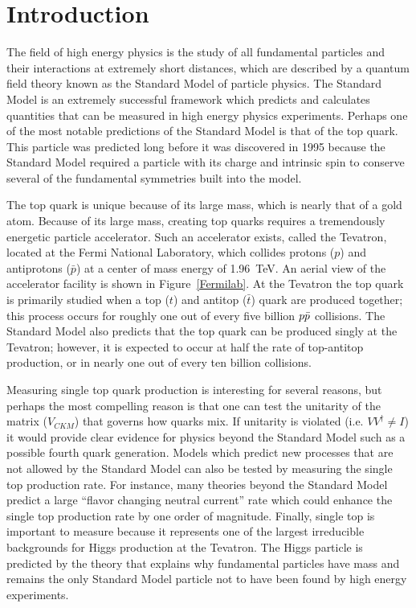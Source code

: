 \chapter{Introduction}

The field of high energy physics is the study of all fundamental particles and their interactions at extremely short distances, which are described by a quantum field theory known as the Standard Model of particle physics. The Standard Model is an extremely successful framework which predicts and calculates quantities that can be measured in high energy physics experiments. Perhaps one of the most notable predictions of the Standard Model is that of the top quark. This particle was predicted long before it was discovered in 1995 because the Standard Model required a particle with its charge and intrinsic spin to conserve several of the fundamental symmetries built into the model.

The top quark is unique because of its large mass, which is nearly that of a gold atom. Because of its large mass, creating top quarks requires a tremendously energetic particle accelerator. Such an accelerator exists, called the Tevatron, located at the Fermi National Laboratory, which collides protons ($p$) and antiprotons ($\bar{p}$) at a center of mass energy of 1.96~TeV. An aerial view of the accelerator facility is shown in Figure~\ref{Fermilab}. At the Tevatron the top quark is primarily studied when a top ($t$) and antitop ($\bar{t}$) quark are produced together;  this process occurs for roughly one out of every five billion $\mbox{$p\bar{p}$}$ collisions. The Standard Model also predicts that the top quark can be produced singly at the Tevatron; however, it is expected to occur at half the rate of top-antitop production, or in nearly one out of every ten billion collisions. 

Measuring single top quark production is interesting for several reasons, but perhaps the most compelling reason is that one can test the unitarity of the matrix ($V_{CKM}$) that governs how quarks mix. If unitarity is violated (i.e. $VV^{\dagger}\neq I$) it would provide clear evidence for physics beyond the Standard Model such as a possible fourth quark generation. Models which predict new processes that are not allowed by the Standard Model can also be tested by measuring the single top production rate. For instance, many theories beyond the Standard Model predict a large ``flavor changing neutral current'' rate which could enhance the single top production rate by one order of magnitude. Finally, single top is important to measure because it represents one of the largest irreducible backgrounds for Higgs production at the Tevatron. The Higgs particle is predicted by the theory that explains why fundamental particles have mass and remains the only Standard Model particle not to have been found by high energy experiments.

